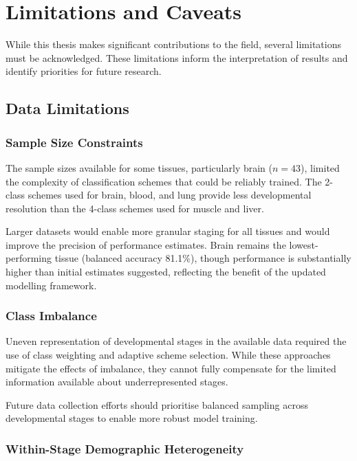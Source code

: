 \section{Limitations and Caveats}\label{sec:discussion:limitations}

While this thesis makes significant contributions to the field, several limitations must be acknowledged. These limitations inform the interpretation of results and identify priorities for future research.

\subsection{Data Limitations}

\subsubsection{Sample Size Constraints}

The sample sizes available for some tissues, particularly brain ($n = 43$), limited the complexity of classification schemes that could be reliably trained. The 2-class schemes used for brain, blood, and lung provide less developmental resolution than the 4-class schemes used for muscle and liver.

Larger datasets would enable more granular staging for all tissues and would improve the precision of performance estimates. Brain remains the lowest-performing tissue (balanced accuracy 81.1\%), though performance is substantially higher than initial estimates suggested, reflecting the benefit of the updated modelling framework.

\subsubsection{Class Imbalance}

Uneven representation of developmental stages in the available data required the use of class weighting and adaptive scheme selection. While these approaches mitigate the effects of imbalance, they cannot fully compensate for the limited information available about underrepresented stages.

Future data collection efforts should prioritise balanced sampling across developmental stages to enable more robust model training.

\subsubsection{Within-Stage Demographic Heterogeneity}


